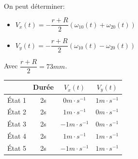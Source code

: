 {~\

\begin{minipage}{0.5\linewidth}
On peut déterminer:
\begin{itemize}
 \item $V_x(t)=-\dfrac{r+R}{2}\left(\omega_{10}(t)+\omega_{20}(t)\right)$
 \item $V_y(t)=-\dfrac{r+R}{2}\left(\omega_{10}(t)-\omega_{20}(t)\right)$\end{itemize}
  
Avec $\dfrac{r+R}{2}=73mm$.
\end{minipage}\hfill
\begin{minipage}{0.45\linewidth}
\begin{tabular}{|c|c|c|c|}
\hline
 & Durée & $V_x(t)$ & $V_y(t)$ \\
\hline
État 1  & 2s & $0m\cdot s^{-1}$& $1m\cdot s^{-1}$\\
\hline
État 2  & 2s & $1m\cdot s^{-1}$& $0m\cdot s^{-1}$\\
\hline
État 3  & 2s & $-1m\cdot s^{-1}$& $0m\cdot s^{-1}$\\
\hline
État 4  & 2s & $1m\cdot s^{-1}$& $1m\cdot s^{-1}$\\
\hline
État 5  & 2s & $-1m\cdot s^{-1}$& $1m\cdot s^{-1}$\\
\hline
\end{tabular}

\end{minipage}

}
